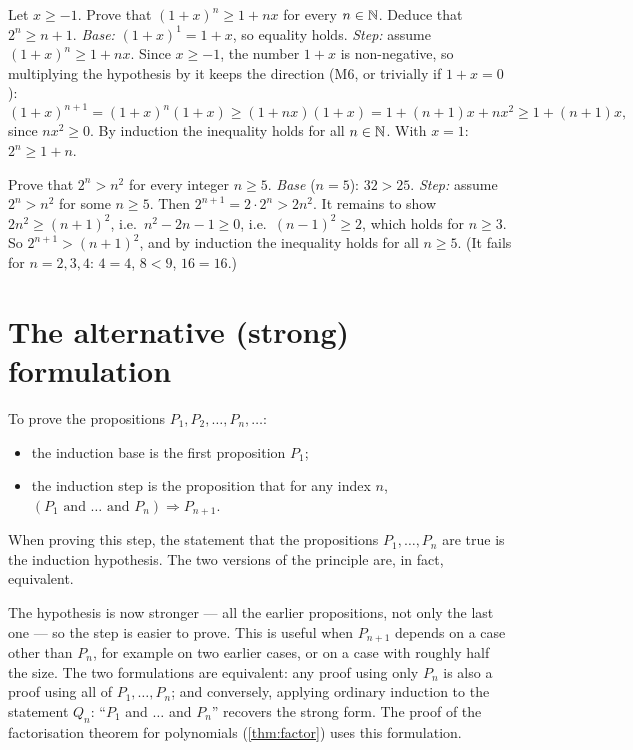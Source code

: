 \begin{example}
Let $x\ge-1$. Prove that $(1+x)^n\ge1+nx$ for every $n\in\mathbb{N}$. Deduce that $2^n\ge n+1$.
\solution
\emph{Base:} $(1+x)^1=1+x$, so equality holds.
\emph{Step:} assume $(1+x)^n\ge1+nx$. Since $x\ge-1$, the number $1+x$ is non-negative, so multiplying the hypothesis
by it keeps the direction (M6, or trivially if $1+x=0$):
\[
(1+x)^{n+1}=(1+x)^n(1+x)\ge(1+nx)(1+x)=1+(n+1)x+nx^2\ge1+(n+1)x,
\]
since $nx^2\ge0$. By induction the inequality holds for all $n\in\mathbb{N}$. With $x=1$: $2^n\ge1+n$.
\end{example}

\begin{example}
Prove that $2^n>n^2$ for every integer $n\ge5$.
\solution
\emph{Base} ($n=5$): $32>25$.
\emph{Step:} assume $2^n>n^2$ for some $n\ge5$. Then $2^{n+1}=2\cdot2^n>2n^2$. It remains to show $2n^2\ge(n+1)^2$, i.e.\
$n^2-2n-1\ge0$, i.e.\ $(n-1)^2\ge2$, which holds for $n\ge3$. So $2^{n+1}>(n+1)^2$, and by induction the inequality holds
for all $n\ge5$. (It fails for $n=2,3,4$: $4=4$, $8<9$, $16=16$.)
\end{example}

\section{The alternative (strong) formulation}\label{sec:strong-ind}

\begin{principle}
To prove the propositions $P_1,P_2,\dots,P_n,\dots$:
\begin{itemize}
  \item the induction base is the first proposition $P_1$;
  \item the induction step is the proposition that for any index $n$, $(P_1\text{ and }\dots\text{ and }P_n)\Rightarrow P_{n+1}$.
\end{itemize}
When proving this step, the statement that the propositions $P_1,\dots,P_n$ are true is the induction hypothesis. The
two versions of the principle are, in fact, equivalent. \src{L1, slide 36; L2, slide 8}
\end{principle}

The hypothesis is now stronger --- all the earlier propositions, not only the last one --- so the step is easier to
prove. This is useful when $P_{n+1}$ depends on a case other than $P_n$, for example on two earlier cases, or on a case
with roughly half the size. The two formulations are equivalent: any proof using only $P_n$ is also a proof using all
of $P_1,\dots,P_n$; and conversely, applying ordinary induction to the statement $Q_n$: ``$P_1$ and $\dots$ and $P_n$''
recovers the strong form. The proof of the factorisation theorem for polynomials (\cref{thm:factor}) uses this
formulation.

